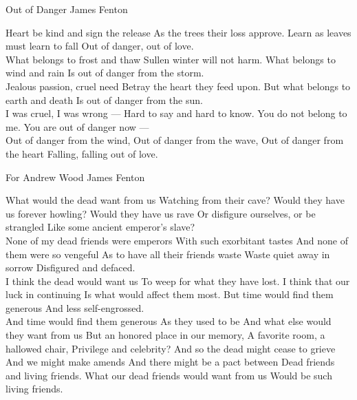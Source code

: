  \begin{poem}
{Out of Danger}
{James Fenton}

Heart be kind and sign the release
 As the trees their loss approve.
 Learn as leaves must learn to fall
 Out of danger, out of love.\\
   
 What belongs to frost and thaw
 Sullen winter will not harm.
 What belongs to wind and rain
 Is out of danger from the storm.\\
   
 Jealous passion, cruel need
 Betray the heart they feed upon.
 But what belongs to earth and death
 Is out of danger from the sun.\\
   
 I was cruel, I was wrong ---
 Hard to say and hard to know.
 You do not belong to me.
 You are out of danger now ---\\
   
 Out of danger from the wind,
 Out of danger from the wave,
 Out of danger from the heart
 Falling, falling out of love.\\
 
\end{poem}
\begin{poem}
  {For Andrew Wood}
  {James Fenton}

What would the dead want from us
Watching from their cave?
Would they have us forever howling?
Would they have us rave
Or disfigure ourselves, or be strangled
Like some ancient emperor’s slave?\\

None of my dead friends were emperors
With such exorbitant tastes
And none of them were so vengeful
As to have all their friends waste
Waste quiet away in sorrow
Disfigured and defaced.\\

I think the dead would want us
To weep for what they have lost.
I think that our luck in continuing
Is what would affect them most.
But time would find them generous
And less self-engrossed.\\

And time would find them generous
As they used to be
And what else would they want from us
But an honored place in our memory,
A favorite room, a hallowed chair,
Privilege and celebrity?
And so the dead might cease to grieve
And we might make amends
And there might be a pact between
Dead friends and living friends.
What our dead friends would want from us
Would be such living friends.\\
\end{poem}

